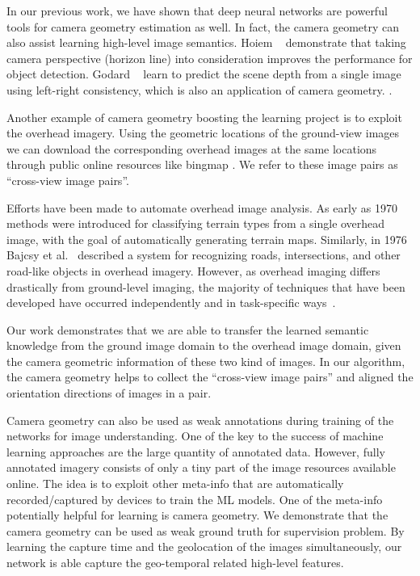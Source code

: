 In our previous work, we have shown that deep neural networks are
powerful tools for camera geometry estimation as well. In fact, the
camera geometry can also assist learning high-level image semantics.
Hoiem \etal~\cite{hoiem2008putting} demonstrate that taking camera
perspective (horizon line) into consideration improves the performance
for object detection. Godard \etal~\cite{godard2017unsupervised} learn
to predict the scene depth from a single image using left-right
consistency, which is also an application of camera geometry.
.

Another example of camera geometry boosting the learning project is to
exploit the overhead imagery. Using the geometric locations of the
ground-view images we can download the corresponding overhead images
at the same locations through public online resources like bingmap
. We refer to these image pairs as ``cross-view image
pairs''.

 Efforts have been made to
automate overhead image analysis. As early as
1970~\cite{idelsohn1970learning} methods were introduced for
classifying terrain types from a single overhead image, with the goal
of automatically generating terrain maps.  Similarly, in 1976 Bajcsy
et al.~\cite{bajcsy1976computer} described a system for recognizing
roads, intersections, and other road-like objects in overhead imagery.
However, as overhead imaging differs drastically from ground-level
imaging, the majority of techniques that have been developed have
occurred independently and in task-specific ways~\cite{Rozen}.

Our work demonstrates that we are able to transfer the learned semantic
knowledge from the ground image domain to the overhead image domain,
given the camera geometric information of these two kind of images. In
our algorithm, the camera geometry helps to collect the ``cross-view
image pairs'' and aligned the orientation directions of images in a
pair.

Camera geometry can also be used as weak annotations during training
of the networks for image understanding.  One of the key to the
success of machine learning approaches are the large quantity of
annotated data. However, fully annotated imagery consists of only a
tiny part of the image resources available online. The idea is to
exploit other meta-info that are automatically recorded/captured by
devices to train the ML models. One of the meta-info potentially
helpful for learning is camera geometry.  We demonstrate that the
camera geometry can be used as weak ground truth for supervision
problem. By learning the capture time and the geolocation of the
images simultaneously, our network is able capture the geo-temporal
related high-level features.

